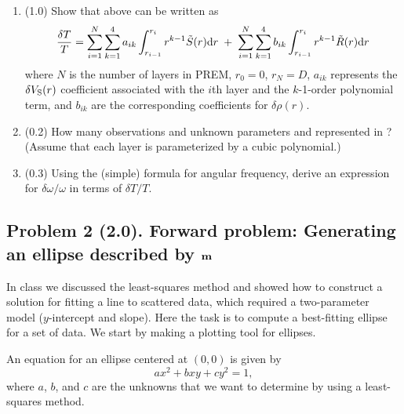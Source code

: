\documentclass[11pt,titlepage,fleqn]{article}
\begin{document}
\begin{enumerate}
\begin{enumerate}
\item (1.0) Show that  above can be written as
%
\begin{equation}
\frac{\delta T}{T} = \sum_{i=1}^N \sum_{k=1}^4 a_{ik} \int_{r_{i-1}}^{r_i} r^{k-1} \tilde{S}(r) \mathrm{d} r
\;+\; \sum_{i=1}^N \sum_{k=1}^4 b_{ik} \int_{r_{i-1}}^{r_i} r^{k-1} \tilde{R}(r) \mathrm{d} r
\label{dT2}
\end{equation}
%
where $N$ is the number of layers in PREM, $r_0 = 0$, $r_N = D$, $a_{ik}$ represents the $\delta V_{\rm S}(r)$ coefficient associated with the $i$th layer and the $k$-1-order polynomial term, and $b_{ik}$ are the corresponding coefficients for $\delta\rho(r)$.

\item (0.2) How many observations and unknown parameters and represented in ? (Assume that each layer is parameterized by a cubic polynomial.)

\item (0.3) Using the (simple) formula for angular frequency, derive an expression for $\delta\omega/\omega$ in terms of $\delta T/T$.

\end{enumerate}

\end{enumerate}


\subsection*{Problem 2 (2.0). Forward problem: Generating an ellipse described by $\mbox{${\bf m}$}$}

In class we discussed the least-squares method and showed how to construct a solution for fitting a line to scattered data, which required a  two-parameter model ($y$-intercept and slope). Here the task is to compute a best-fitting ellipse for a set of data. We start by making a plotting tool for ellipses.

An equation for an ellipse centered at $(0,0)$ is given by
%
\begin{equation}
ax^2 + bxy + cy^2 = 1,
\label{ellipse}
\end{equation}
%
where $a$, $b$, and $c$ are the unknowns that we want to determine by using a least-squares method.
\end{document}
